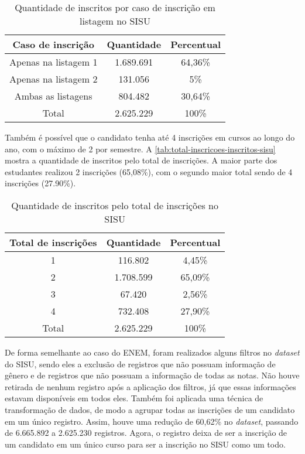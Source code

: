 \begin{table}[h]
  \begin{tabular}{ccc}
  \hline
  \textbf{Caso de inscrição} & \textbf{Quantidade} & \textbf{Percentual} \\ \hline
  Apenas na listagem 1  & 1.689.691  &  64,36\%                      \\ \hline
  Apenas na listagem 2  & 131.056  &   5\%                        \\ \hline
  Ambas as listagens & 804.482  &    30,64\%                     \\ \hline
  Total  & 2.625.229  &  100\%                        \\ \hline
  \end{tabular}
  \caption{Quantidade de inscritos por caso de inscrição em listagem no SISU}
  \label{tab:caso-inscricao-sisu}
  \end{table}

Também é possível que o candidato tenha até 4 inscrições em cursos ao longo do ano, com o máximo de 2 por semestre. A \autoref{tab:total-inscricoes-inscritos-sisu} mostra a quantidade de inscritos pelo total de inscrições. A maior parte dos estudantes realizou 2 inscrições (65,08\%), com o segundo maior total sendo de 4 inscrições (27.90\%). 

\begin{table}[]
  \centering
  \begin{tabular}{ccc}
  \hline
  \textbf{Total de inscrições} & \textbf{Quantidade} & \textbf{Percentual} \\ \hline
  1                   & 116.802  &  4,45\%  \\ \hline
  2                   & 1.708.599  &  65,09\%  \\ \hline
  3                   & 67.420  &  2,56\%  \\ \hline
  4                   & 732.408  & 27,90\%  \\ \hline
  Total               & 2.625.229  &  100\%  \\ \hline
  \end{tabular}
  \caption{Quantidade de inscritos pelo total de inscrições no SISU}
  \label{tab:total-inscricoes-inscritos-sisu}
  \end{table}

De forma semelhante ao caso do ENEM, foram realizados alguns filtros no \textit{dataset} do SISU, sendo eles a exclusão de registros que não possuam informação de gênero e de registros que não possuam a informação de todas as notas. Não houve retirada de nenhum registro após a aplicação dos filtros, já que essas informações estavam disponíveis em todos eles. Também foi aplicada uma técnica de transformação de dados, de modo a agrupar todas as inscrições de um candidato em um único registro. Assim, houve uma redução de 60,62\% no \textit{dataset}, passando de 6.665.892 a 2.625.230 registros. Agora, o registro deixa de ser a inscrição de um candidato em um único curso para ser a inscrição no SISU como um todo.

